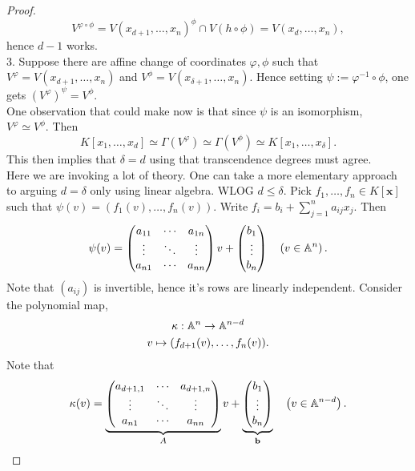 \begin{proof}
    $$V^{\varphi\circ \phi} = V(x_{d+1},\dots,x_n)^\phi\cap V(h\circ \phi) = V(x_d,\dots,x_n),$$
    hence $d-1$ works.\\
    3. Suppose there are affine change of coordinates $\varphi,\phi$ such that $V^\varphi = V(x_{d+1},\dots,x_n)$ and $V^\phi = V(x_{\delta+1},\dots,x_n)$. Hence setting $\psi:= \varphi^{-1}\circ \phi$, one gets $\left(V^\varphi\right)^\psi = V^\phi$.\\
    One observation that could make now is that since $\psi$ is an isomorphism,\\ $V^\varphi \simeq V^\phi$. Then 
    $$K[x_1,\dots,x_d]\simeq \Gamma\left(V^\varphi\right)\simeq \Gamma\left(V^\phi\right)\simeq K[x_1,\dots,x_\delta].$$
    This then implies that $\delta=d$ using that transcendence degrees must agree.\\
    Here we are invoking a lot of theory. One can take a more elementary approach to arguing $d=\delta$ only using linear algebra. WLOG $ d\leq \delta$. Pick $f_1,\dots,f_n\in K[\mathbf{x}]$ such that $\psi(v)=(f_1(v),\dots,f_n(v))$. Write $f_i=b_i + \sum_{j=1}^n a_{ij}x_j$. Then 
    $$\psi(v) = \begin{pmatrix}
        a_{11}& \cdots & a_{1n}\\
        \vdots & \ddots & \vdots\\
        a_{n1} & \cdots & a_{nn}
    \end{pmatrix}v + \begin{pmatrix}
        b_1 \\ \vdots \\ b_n
    \end{pmatrix} \quad \left(v\in \mathbb{A}^n\right).$$
    Note that $(a_{ij})$ is invertible, hence it's rows are linearly independent. 
    Consider the polynomial map,
    \begin{gather*}
        \kappa: \mathbb{A}^n \rightarrow \mathbb{A}^{n-d}\\
        v\mapsto (f_{d+1}(v),\dots,f_n(v)).
    \end{gather*}
    Note that 
    $$\kappa(v) = \underbrace{\begin{pmatrix}
        a_{d+1,1}& \cdots & a_{d+1,n}\\
        \vdots & \ddots & \vdots\\
        a_{n1} & \cdots & a_{nn}
    \end{pmatrix}}_{A}v + \underbrace{\begin{pmatrix}
        b_1 \\ \vdots \\ b_n \end{pmatrix}}_\mathbf{b} \quad \left(v\in \mathbb{A}^{n-d}\right).$$

\end{proof}
